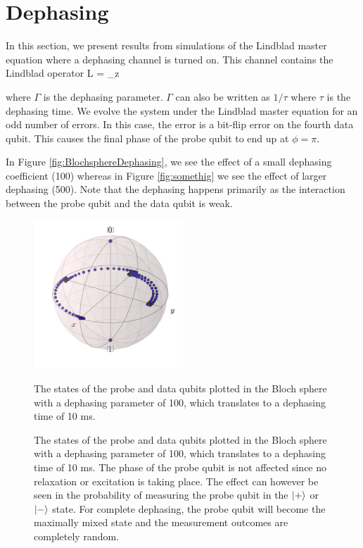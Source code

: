 \section{Dephasing}
In this section, we present results from simulations of the Lindblad master equation where a dephasing channel is turned on. This channel contains the Lindblad operator
\beq
L  = \sqrt{\Gamma} \sigma_z
\eeq

where $\Gamma$ is the dephasing parameter. $\Gamma$ can also be written as $1/\tau$ where $\tau$ is the dephasing time. We evolve the system under the Lindblad master equation for an odd number of errors. In this case, the error is a bit-flip error on the fourth data qubit.  This causes the final phase of the probe qubit to end up at $\phi = \pi$. 

In Figure \ref{fig:BlochsphereDephasing}, we see the effect of a small dephasing coefficient (100) whereas in Figure \ref{fig:somethig} we see the effect of larger dephasing (500). Note that the dephasing happens primarily as the interaction between the probe qubit and the data qubit is weak. 



\begin{figure}[h]
  \centering
    \includegraphics[width=0.5\textwidth]{Figures/Circ_orbit_odd_100_dephasing.png}
      \caption{The states of the probe and data qubits plotted in the Bloch sphere with a dephasing parameter of 100, which translates to a dephasing time of 10 ms. The phase of the probe qubit is not affected since no relaxation or excitation is taking place. The effect can however be seen in the probability of measuring the probe qubit in the $\ket{+}$ or $\ket{-}$ state. For complete dephasing, the probe qubit will become the maximally mixed state and the measurement outcomes are completely random. }The states of the probe and data qubits plotted in the Bloch sphere with a dephasing parameter of 100, which translates to a dephasing time of 10 ms.
\end{figure}




